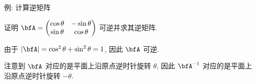 \begin{frame}{例: 计算逆矩阵}
	\onslide<+->
	\begin{example}
		证明 $\bfA=\begin{pmatrix}
			\cos\theta&-\sin\theta\\
			\sin\theta&\cos\theta
		\end{pmatrix}$ 可逆并求其逆矩阵.
	\end{example}
	\onslide<+->
	\begin{solution}
		由于 $|\bfA|=\cos^2\theta+\sin^2\theta=1$, 因此 $\bfA$ 可逆.
		\vspace{-\baselineskip}
	\end{solution}
	\onslide<+->
	注意到 $\bfA$ 对应的是平面上沿原点逆时针旋转 $\theta$, 因此 $\bfA^{-1}$ 对应的是平面上沿原点逆时针旋转 $-\theta$.
\end{frame}


